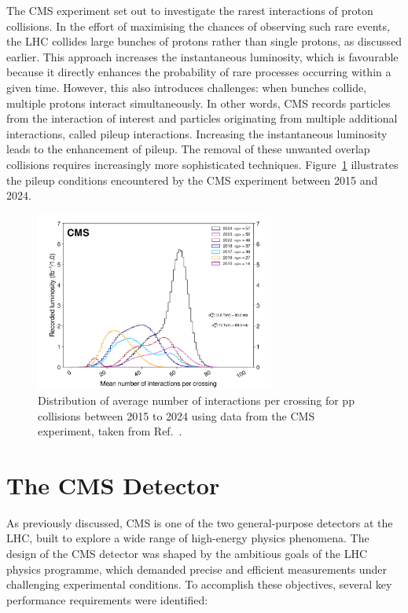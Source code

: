 The CMS experiment set out to investigate the rarest interactions of proton collisions. In the effort of maximising the chances of observing such rare events, the LHC collides large bunches of protons rather than single protons, as discussed earlier. This approach increases the instantaneous luminosity, which is favourable because it directly enhances the probability of rare processes occurring within a given time. However, this also introduces challenges: when bunches collide, multiple protons interact simultaneously. In other words, CMS records particles from the interaction of interest and particles originating from multiple additional interactions, called pileup interactions. Increasing the instantaneous luminosity leads to the enhancement of pileup. The removal of these unwanted overlap collisions requires increasingly more sophisticated techniques. Figure~\ref{Figure:Chapter3_CMS_Pileup} illustrates the pileup conditions encountered by the CMS experiment between 2015 and 2024.

\begin{figure}[h]
\centering
\includegraphics[width= 0.7\textwidth]{Figures/Chapter3/CMS_Pileup.pdf}
\caption{Distribution of average number of interactions per crossing for pp collisions between 2015 to 2024 using data from the CMS experiment, taken from Ref.~\cite{CMS_IntegratedLumi}.}
\label{Figure:Chapter3_CMS_Pileup}
\end{figure}

\section{The CMS Detector}
\label{Section:Chapter3_CMS_Detector_Introduction}
As previously discussed, CMS is one of the two general-purpose detectors at the LHC, built to explore a wide range of high-energy physics phenomena. The design of the CMS detector was shaped by the ambitious goals of the LHC physics programme, which demanded precise and efficient measurements under challenging experimental conditions. To accomplish these objectives, several key performance requirements were identified:

